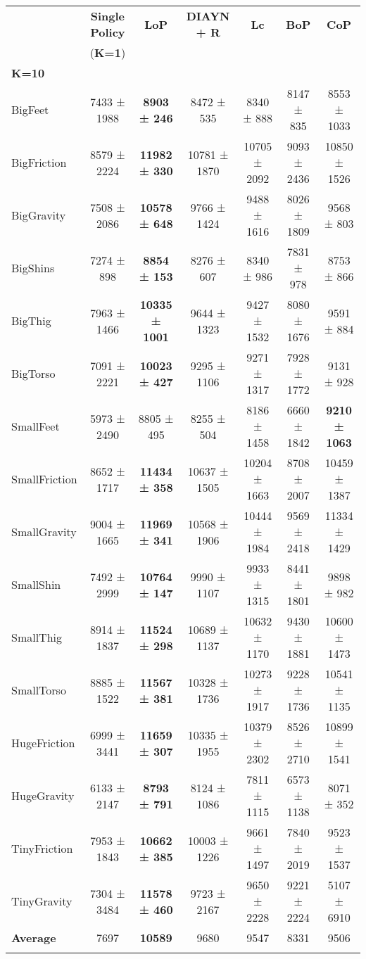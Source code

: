 \scriptsize{}
\begin{tabular}{l|c|c|c|c|c|c}
 &\textbf{Single Policy} &\textbf{LoP} &\textbf{DIAYN + R} &\textbf{Lc} &\textbf{BoP} &\textbf{CoP} \\ 
 & (\textbf{K=1}) & & & & &\\ \midrule
 \textbf{K=10}& & & & & \\
BigFeet &7433 ± 1988 &\textbf{8903 ± 246} &8472 ± 535 &8340 ± 888 &8147 ± 835 &8553 ± 1033 \\
BigFriction &8579 ± 2224 &\textbf{11982 ± 330} &10781 ± 1870 &10705 ± 2092 &9093 ± 2436 &10850 ± 1526 \\
BigGravity &7508 ± 2086 &\textbf{10578 ± 648} &9766 ± 1424 &9488 ± 1616 &8026 ± 1809 &9568 ± 803 \\
BigShins &7274 ± 898 &\textbf{8854 ± 153} &8276 ± 607 &8340 ± 986 &7831 ± 978 &8753 ± 866 \\
BigThig &7963 ± 1466 &\textbf{10335 ± 1001} &9644 ± 1323 &9427 ± 1532 &8080 ± 1676 &9591 ± 884 \\
BigTorso &7091 ± 2221 &\textbf{10023 ± 427} &9295 ± 1106 &9271 ± 1317 &7928 ± 1772 &9131 ± 928 \\
SmallFeet &5973 ± 2490 &8805 ± 495 &8255 ± 504 &8186 ± 1458 &6660 ± 1842 &\textbf{9210 ± 1063} \\
SmallFriction &8652 ± 1717 &\textbf{11434 ± 358} &10637 ± 1505 &10204 ± 1663 &8708 ± 2007 &10459 ± 1387 \\
SmallGravity &9004 ± 1665 &\textbf{11969 ± 341} &10568 ± 1906 &10444 ± 1984 &9569 ± 2418 &11334 ± 1429 \\
SmallShin &7492 ± 2999 &\textbf{10764 ± 147} &9990 ± 1107 &9933 ± 1315 &8441 ± 1801 &9898 ± 982 \\
SmallThig &8914 ± 1837 &\textbf{11524 ± 298} &10689 ± 1137 &10632 ± 1170 &9430 ± 1881 &10600 ± 1473 \\
SmallTorso &8885 ± 1522 &\textbf{11567 ± 381} &10328 ± 1736 &10273 ± 1917 &9228 ± 1736 &10541 ± 1135 \\
HugeFriction &6999 ± 3441 &\textbf{11659 ± 307} &10335 ± 1955 &10379 ± 2302 &8526 ± 2710 &10899 ± 1541 \\
HugeGravity &6133 ± 2147 &\textbf{8793 ± 791} &8124 ± 1086 &7811 ± 1115 &6573 ± 1138 &8071 ± 352 \\
TinyFriction &7953 ± 1843 &\textbf{10662 ± 385} &10003 ± 1226 &9661 ± 1497 &7840 ± 2019 &9523 ± 1537 \\
TinyGravity &7304 ± 3484 &\textbf{11578 ± 460} &9723 ± 2167 &9650 ± 2228 &9221 ± 2224 &5107 ± 6910 \\\bottomrule
\textbf{Average} &7697 &\textbf{10589} &9680 &9547 &8331 &9506 \\\bottomrule
\vspace{0.5cm}
\end{tabular}

